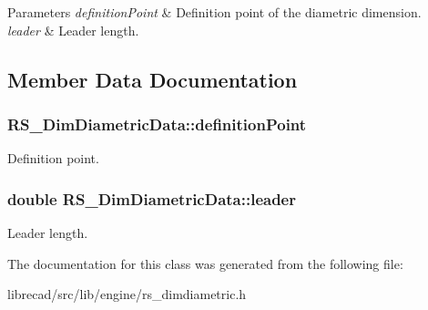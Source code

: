 \begin{DoxyParams}{Parameters}
{\em definition\-Point} & Definition point of the diametric dimension. \\
\hline
{\em leader} & Leader length. \\
\hline
\end{DoxyParams}


\subsection{Member Data Documentation}
\hypertarget{classRS__DimDiametricData_a1e8fe38b2cd3d9fb842cf0d5c4f7a579}{
\subsubsection[{definition\-Point}]{ R\-S\-\_\-\-Dim\-Diametric\-Data\-::definition\-Point}}\label{classRS__DimDiametricData_a1e8fe38b2cd3d9fb842cf0d5c4f7a579}
Definition point. \hypertarget{classRS__DimDiametricData_a38b4fe578738e8127ec5c49dc1def401}{
\subsubsection[{leader}]{\setlength{\rightskip}{0pt plus 5cm}double R\-S\-\_\-\-Dim\-Diametric\-Data\-::leader}}\label{classRS__DimDiametricData_a38b4fe578738e8127ec5c49dc1def401}
Leader length. 

The documentation for this class was generated from the following file\-:\begin{DoxyCompactItemize}
\item 
librecad/src/lib/engine/rs\-\_\-dimdiametric.\-h\end{DoxyCompactItemize}
